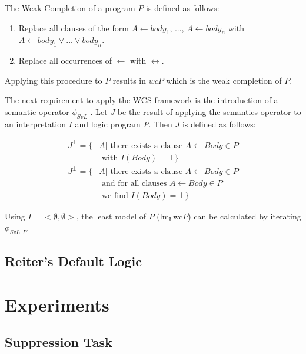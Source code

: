 \documentclass[
11pt, %
english, %
singlespacing, %
headsepline, %
]{MastersDoctoralThesis} %
\begin{document}
The Weak Completion of a program $P$ is defined as follows:

\begin{enumerate}
\item Replace all clauses of the form $A \leftarrow body_1$, ..., $A \leftarrow body_n$ with $A \leftarrow body_1 \lor ... \lor body_n$.
\item Replace all occurrences of $\leftarrow$ with $\leftrightarrow$.
\end{enumerate}

Applying this procedure to $P$ results in $wcP$ which is the weak completion of $P$.

The next requirement to apply the WCS framework is the introduction of a semantic operator $\phi_{SvL}$ \citep{stenning2008interpretation}. Let $J$ be the result of applying the semantics operator to an interpretation $I$ and logic program $P$. Then $J$ is defined as follows:

\[
\begin{split}
J^\top = \{ & A | \textrm{ there exists a clause } A\leftarrow Body \in P \\ & \textrm{ with } I(Body) = \top\}
\end{split}
\]
\[
\begin{split}
J^\bot = \{ &  A | \textrm{ there exists a clause } A \leftarrow Body \in P \\
           & \textrm{ and for all clauses } A \leftarrow Body \in P \\ & \textrm{ we find } I(Body) = \bot\}
\end{split}
\]

Using $I=<\emptyset, \emptyset>$, the least model of $P$ ($\textrm{lm}_\textrm{\L}$wc$P$) can be calculated by iterating $\phi_{SvL,P}$.

\section{Reiter's Default Logic}


\chapter{Experiments} \label{chp:experiments}
\section{Suppression Task} \label{sec:sup}
\end{document}
